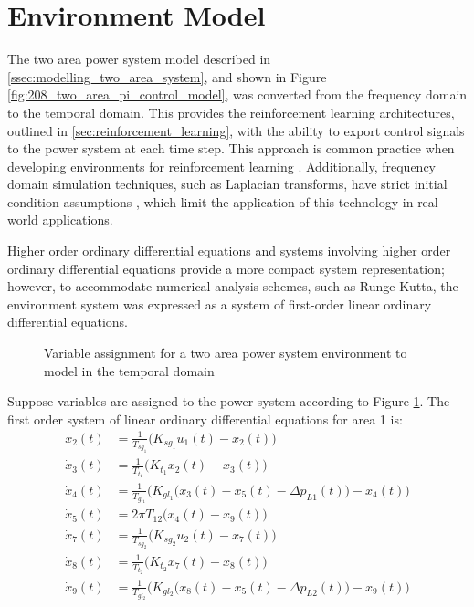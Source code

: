\section{Environment Model} \label{ssec:env_modelling}
The two area power system model described in \textsection \ref{ssec:modelling_two_area_system}, and shown in Figure \ref{fig:208_two_area_pi_control_model}, was converted from the frequency domain to the temporal domain. This provides the reinforcement learning architectures, outlined in \textsection \ref{sec:reinforcement_learning}, with the ability to export control signals to the power system at each time step. This approach is common practice when developing environments for reinforcement learning \cite{Brockman2016}. Additionally, frequency domain simulation techniques, such as Laplacian transforms, have strict initial condition assumptions \cite{Ogat2010}, which limit the application of this technology in real world applications.

Higher order ordinary differential equations and systems involving higher order ordinary differential equations provide a more compact system representation; however, to accommodate numerical analysis schemes, such as Runge-Kutta, the environment system was expressed as a system of first-order linear ordinary differential equations.

\begin{figure}[h]
	\centering
	\resizebox{\textwidth}{!}{}
	\caption[Two-area power system ODE derivation]{Variable assignment for a two area power system environment to model in the temporal domain}
	\label{4101_two_area_power_system_temporal_model}
\end{figure}

Suppose variables are assigned to the power system according to Figure \ref{4101_two_area_power_system_temporal_model}. The first order system of linear ordinary differential equations for area 1 is:
\begin{align}
	\dot{x}_2(t) &= \frac{1}{T_{sg_1}}\big( K_{sg_1} u_1(t) - x_2(t) \big) \label{eq:4101} \\
	\dot{x}_3(t) &= \frac{1}{T_{t_1}} \big( K_{t_1} x_2(t) - x_3(t) \big) \label{eq:4102} \\
	\dot{x}_4(t) &= \frac{1}{T_{gl_1}} \bigg( K_{gl_1} \big( x_3(t) - x_5(t) - \Delta p_{L1}(t) \big) - x_4(t) \bigg) \label{eq:4103}  \\
	\dot{x}_5(t) &= 2 \pi T_{12} \big( x_4(t) - x_9(t) \big) \label{eq:4104} \\
	\dot{x}_7(t) &= \frac{1}{T_{sg_2}}\big( K_{sg_2} u_2(t) - x_7(t) \big) \label{eq:4105} \\
	\dot{x}_8(t) &= \frac{1}{T_{t_2}} \big( K_{t_2} x_7(t) - x_8(t) \big) \label{eq:4106} \\
	\dot{x}_9(t) &= \frac{1}{T_{gl_2}} \bigg( K_{gl_2} \big( x_8(t) - x_5(t) - \Delta p_{L2}(t) \big) - x_9(t) \bigg) \label{eq:4107}
\end{align}

